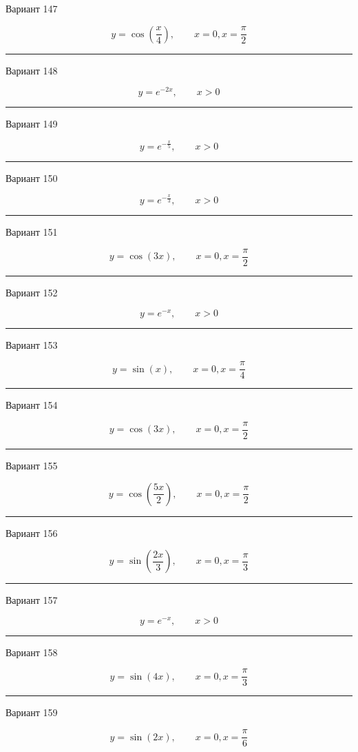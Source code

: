 \documentclass[11pt]{report}
\begin{document}
Вариант 147

$$y=\cos{\left(\frac{x}{4} \right)}, \qquad x = 0, x = \frac{\pi}{2}$$

\rule{\textwidth}{.2mm}

Вариант 148

$$y=e^{- 2 x}, \qquad x > 0$$

\rule{\textwidth}{.2mm}

Вариант 149

$$y=e^{- \frac{x}{5}}, \qquad x > 0$$

\rule{\textwidth}{.2mm}

Вариант 150

$$y=e^{- \frac{x}{3}}, \qquad x > 0$$

\rule{\textwidth}{.2mm}

Вариант 151

$$y=\cos{\left(3 x \right)}, \qquad x = 0, x = \frac{\pi}{2}$$

\rule{\textwidth}{.2mm}

Вариант 152

$$y=e^{- x}, \qquad x > 0$$

\rule{\textwidth}{.2mm}

Вариант 153

$$y=\sin{\left(x \right)}, \qquad x = 0, x = \frac{\pi}{4}$$

\rule{\textwidth}{.2mm}

Вариант 154

$$y=\cos{\left(3 x \right)}, \qquad x = 0, x = \frac{\pi}{2}$$

\rule{\textwidth}{.2mm}

Вариант 155

$$y=\cos{\left(\frac{5 x}{2} \right)}, \qquad x = 0, x = \frac{\pi}{2}$$

\rule{\textwidth}{.2mm}

Вариант 156

$$y=\sin{\left(\frac{2 x}{3} \right)}, \qquad x = 0, x = \frac{\pi}{3}$$

\rule{\textwidth}{.2mm}

Вариант 157

$$y=e^{- x}, \qquad x > 0$$

\rule{\textwidth}{.2mm}

Вариант 158

$$y=\sin{\left(4 x \right)}, \qquad x = 0, x = \frac{\pi}{3}$$

\rule{\textwidth}{.2mm}

Вариант 159

$$y=\sin{\left(2 x \right)}, \qquad x = 0, x = \frac{\pi}{6}$$
\end{document}
